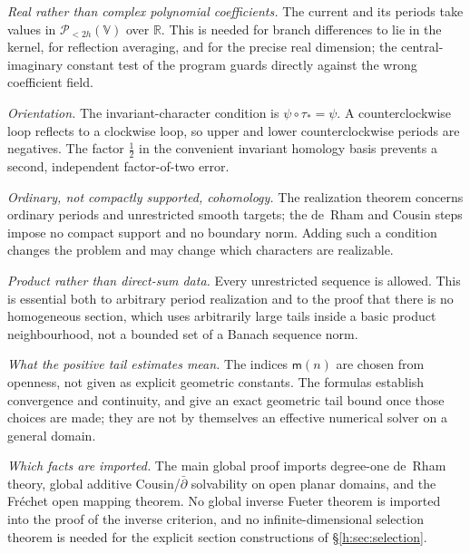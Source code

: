 \documentclass[11pt,a4paper]{article}
\numberwithin{equation}{section}
\theoremstyle{definition}
\theoremstyle{remark}
\theoremstyle{plain}
\newcommand{\RR}{\mathbb R}
\newcommand{\VV}{\mathbb V}                       %
\newcommand{\PolH}{\mathscr P_{<2h}(\VV)}
\begin{document}
\emph{Real rather than complex polynomial coefficients.} The current and its
periods take values in $\PolH$ over $\RR$. This is needed for branch
differences to lie in the kernel, for reflection averaging, and for the precise
real dimension; the central-imaginary constant test of the program guards
directly against the wrong coefficient field.

\emph{Orientation.} The invariant-character condition is $\psi\circ\tau_*=\psi$.
A counterclockwise loop reflects to a clockwise loop, so upper and lower
counterclockwise periods are negatives. The factor $\tfrac12$ in the convenient
invariant homology basis prevents a second, independent factor-of-two error.

\emph{Ordinary, not compactly supported, cohomology.} The realization theorem
concerns ordinary periods and unrestricted smooth targets; the de~Rham and
Cousin steps impose no compact support and no boundary norm. Adding such a
condition changes the problem and may change which characters are realizable.

\emph{Product rather than direct-sum data.} Every unrestricted sequence is
allowed. This is essential both to arbitrary period realization and to the
proof that there is no homogeneous section, which uses arbitrarily large tails
inside a basic product neighbourhood, not a bounded set of a Banach sequence
norm.

\emph{What the positive tail estimates mean.} The indices $\mathsf m(n)$ are
chosen from openness, not given as explicit geometric constants. The formulas
establish convergence and continuity, and give an exact geometric tail bound
once those choices are made; they are not by themselves an effective numerical
solver on a general domain.

\emph{Which facts are imported.} The main global proof imports degree-one
de~Rham theory, global additive Cousin/$\bar\partial$ solvability on open planar
domains, and the Fr\'echet open mapping theorem. No global inverse Fueter
theorem is imported into the proof of the inverse criterion, and no
infinite-dimensional selection theorem is needed for the explicit section
constructions of \S\ref{h:sec:selection}.
\end{document}
